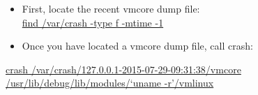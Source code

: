\documentclass{article}
\begin{document}
\begin{itemize}
\item First, locate the recent vmcore dump file:\\

  \underline{find /var/crash -type f -mtime -1}\\

\item Once you have located a vmcore dump file, call crash:\\

\end{itemize}
\underline{crash /var/crash/127.0.0.1-2015-07-29-09:31:38/vmcore /usr/lib/debug/lib/modules/`uname -r'/vmlinux}
\begin{figure}[H]        
\end{figure}
\end{document}
